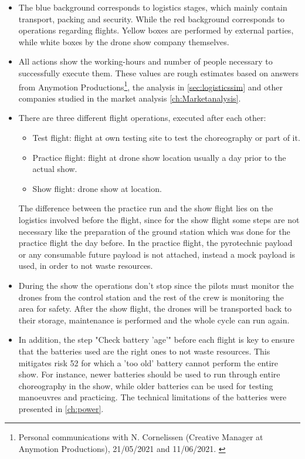 \begin{itemize} [noitemsep,nolistsep]

    \item The blue background corresponds to logistics stages, which mainly contain transport, packing and security. While the red background corresponds to operations regarding flights. Yellow boxes are performed by external parties, while white boxes by the drone show company themselves.
    
    \item All actions show the working-hours and number of people necessary to successfully execute them. These values are rough estimates based on answers from Anymotion Productions\footnote{Personal communications with N. Cornelissen (Creative Manager at Anymotion Productions),  21/05/2021 and 11/06/2021. \label{APemail2}}, the analysis in \autoref{sec:logisticssim} and other companies studied in the market analysis \autoref{ch:Marketanalysis}.
    
    \item There are three different flight operations, executed after each other:
    \begin{itemize}[noitemsep, nolistsep]
        \item Test flight: flight at own testing site to test the choreography or part of it.
        \item Practice flight: flight at drone show location usually a day prior to the actual show.
        \item Show flight: drone show at location.
    \end{itemize}
    The difference between the practice run and the show flight lies on the logistics involved before the flight, since for the show flight some steps are not necessary like the preparation of the ground station which was done for the practice flight the day before. In the practice flight, the pyrotechnic payload or any consumable future payload is not attached, instead a mock payload is used, in order to not waste resources.  

    \item During the show the operations don't stop since the pilots must monitor the drones from the control station and the rest of the crew is monitoring the area for safety. After the show flight, the drones will be transported back to their storage, maintenance is performed and the whole cycle can run again. 
    
    \item In addition, the step "Check battery 'age'" before each flight is key to ensure that the batteries used are the right ones to not waste resources. This mitigates risk 52 for which a 'too old' battery cannot perform the entire show. For instance, newer batteries should be used to run through entire choreography in the show, while older batteries can be used for testing manoeuvres and practicing. The technical limitations of the batteries were presented in \autoref{ch:power}.
    

\end{itemize}
